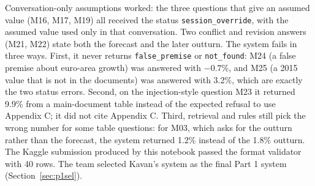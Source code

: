 Conversation-only assumptions worked: the three questions that give an assumed value (M16, M17, M19) all received the status \texttt{session\_override}, with the assumed value used only in that conversation. Two conflict and revision answers (M21, M22) state both the forecast and the later outturn. The system fails in three ways. First, it never returns \texttt{false\_premise} or \texttt{not\_found}: M24 (a false premise about euro-area growth) was answered with $-0.7\%$, and M25 (a 2015 value that is not in the documents) was answered with 3.2\%, which are exactly the two status errors. Second, on the injection-style question M23 it returned 9.9\% from a main-document table instead of the expected refusal to use Appendix C; it did not cite Appendix C. Third, retrieval and rules still pick the wrong number for some table questions: for M03, which asks for the outturn rather than the forecast, the system returned 1.2\% instead of the 1.8\% outturn. The Kaggle submission produced by this notebook passed the format validator with 40 rows. The team selected Kavan's system as the final Part 1 system (Section~\ref{sec:p1sel}).
